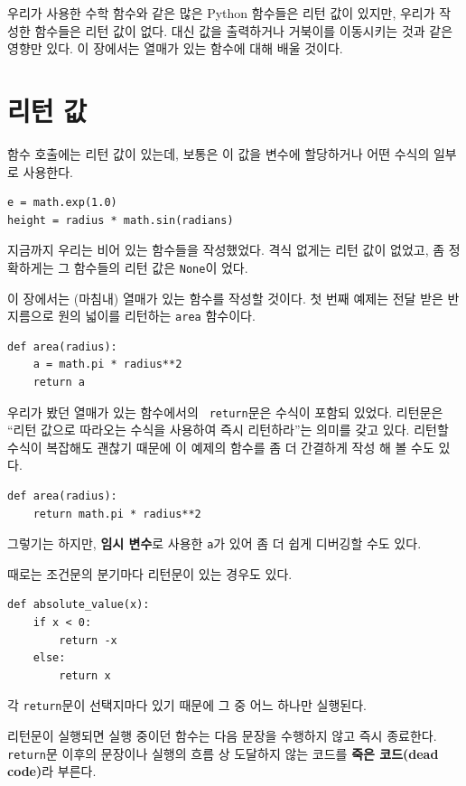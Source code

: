 \documentclass[10pt]{book}
\begin{document}
우리가 사용한 수학 함수와 같은 많은 Python 함수들은 리턴 값이 있지만,
우리가 작성한 함수들은 리턴 값이 없다.  대신 값을 출력하거나 거북이를
이동시키는 것과 같은 영향만 있다.  이 장에서는 열매가 있는 함수에 대해
배울 것이다.



\section{리턴 값}

함수 호출에는 리턴 값이 있는데, 보통은 이 값을 변수에 할당하거나 어떤
수식의 일부로 사용한다.


\begin{verbatim}
e = math.exp(1.0)
height = radius * math.sin(radians)
\end{verbatim}
%
지금까지 우리는 비어 있는 함수들을 작성했었다.  격식 없게는 리턴 값이
없었고, 좀 정확하게는 그 함수들의 리턴 값은 {\tt None}이 었다.

이 장에서는 (마침내) 열매가 있는 함수를 작성할 것이다.  첫 번째 예제는
전달 받은 반지름으로 원의 넓이를 리턴하는 {\tt area} 함수이다.

\begin{verbatim}
def area(radius):
    a = math.pi * radius**2
    return a
\end{verbatim}
%
우리가 봤던 열매가 있는 함수에서의 {\tt
  return}문은  수식이 포함되 있었다.  리턴문은 ``리턴 값으로
따라오는 수식을 사용하여 즉시 리턴하라''는 의미를 갖고 있다.  리턴할
수식이 복잡해도 괜찮기 때문에 이 예제의 함수를 좀 더 간결하게 작성 해
볼 수도 있다.

\begin{verbatim}
def area(radius):
    return math.pi * radius**2
\end{verbatim}
%
그렇기는 하지만, {\bf 임시 변수}로 사용한 {\tt a}가 있어 좀 더 쉽게
디버깅할 수도 있다.

때로는 조건문의 분기마다 리턴문이 있는 경우도 있다. 

\begin{verbatim}
def absolute_value(x):
    if x < 0:
        return -x
    else:
        return x
\end{verbatim}
%
각 {\tt return}문이 선택지마다 있기 때문에 그 중 어느 하나만 실행된다. 

리턴문이 실행되면 실행 중이던 함수는 다음 문장을 수행하지 않고 즉시
종료한다.  {\tt return}문 이후의 문장이나 실행의 흐름 상 도달하지 않는
코드를 {\bf 죽은 코드(dead code)}라 부른다.
\end{document}
